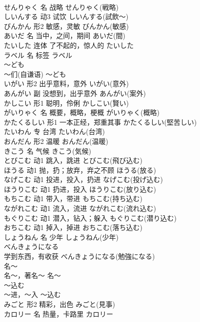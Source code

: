 \documentclass[8pt]{extreport}
\begin{document}
\begin{CJK}{UTF8}{min}
\\	せんりゃく	名	战略	せんりゃく(戦略)	
\\	しいんする	动3	试饮	しいんする(試飲～)	
\\	びんかん	形2	敏感，灵敏	びんかん(敏感)	
\\	あいだ	名	当中，之间，期间	あいだ(間)	
\\	たいした	连体	了不起的，惊人的	たいした	
\\	ラベル	名	标签	ラベル	
\\	～ども	
\\	～们(自谦语)	～ども	
\\	いがい	形2	出乎意料，意外	いがい(意外)	
\\	あんがい	副	没想到，出乎意外	あんがい(案外)	
\\	かしこい	形1	聪明，伶俐	かしこい(賢い)	
\\	がいりゃく	名	概要，概略，梗概	がいりゃく(概略)	
\\	かたくるしい	形1	一本正经，郑重其事	かたくるしい(堅苦しい)	
\\	たいわん	专	台湾	たいわん(台湾)	
\\	おんだん	形2	温暖	おんだん(温暖)	
\\	きこう	名	气候	きこう(気候)	
\\	とびこむ	动1	跳入，跳进	とびこむ(飛び込む)	
\\	ほうる	动1	抛，扔；放弃，弃之不顾	ほうる(放る)	
\\	なげこむ	动1	投进，投入，扔进	なげこむ(投げ込む)	
\\	ほうりこむ	动1	扔进，投入	ほうりこむ(放り込む)	
\\	もちこむ	动1	带入，带进	もちこむ(持ち込む)	
\\	ながれこむ	动1	流入，流进	ながれこむ(流れ込む)	
\\	もぐりこむ	动1	潜入，钻入；躲入	もぐりこむ(潜り込む)	
\\	おちこむ	动1	掉入，掉进	おちこむ(落ち込む)	
\\	しょうねん	名	少年	しょうねん(少年)	
\\	べんきょうになる	
\\	学到东西，有收获	べんきょうになる(勉強になる)	
\\	名～	
\\	名～，著名～	名～	
\\	～込む	
\\	～进，～入	～込む	
\\	みごと	形2	精彩，出色	みごと(見事)	
\\	カロリー	名	热量，卡路里	カロリー	

\end{CJK}
\end{document}
